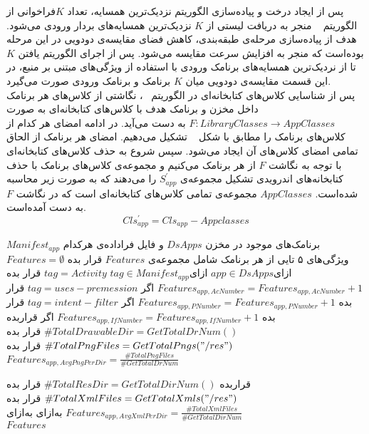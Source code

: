 پس از ایجاد درخت و پیاده‌سازی الگوریتم نزدیک‌ترین همسایه، تعداد $K $فراخوانی از الگوریتم ~ منجر به دریافت لیستی از $K $ نزدیک‌ترین همسایه‌های بردار ورودی می‌شود. 
هدف از پیاده‌سازی مرحله‌ی  طبقه‌بندی، کاهش فضای مقایسه‌ی دودویی در این مرحله بوده‌است که منجر به افزایش سرعت مقایسه می‌شود. پس از اجرای الگوریتم یافتن $K$ تا از نردیک‌ترین همسایه‌های برنامک ورودی با استفاده از ویژگی‌های مبتنی بر منبع، در این قسمت مقایسه‌ی دودویی میان $K$ برنامک و برنامک ورودی صورت می‌گیرد.\\ 
پس از شناسایی کلاس‌های کتابخانه‌ای در الگوریتم ~، نگاشتی از کلاس‌های هر برنامک داخل مخزن و برنامک هدف با کلاس‌های کتابخانه‌ای به صورت $F:LibraryClasses\rightarrow AppClasses$ به دست می‌آید. در ادامه امضای هر کدام از کلاس‌های برنامک را مطابق با شکل ~ تشکیل می‌دهیم. امضای هر برنامک از الحاق تمامی امضای کلاس‌های آن ایجاد می‌شود. سپس شروع به حذف کلاس‌های کتابخانه‌ای با توجه به نگاشت $F$ از هر برنامک می‌کنیم و مجموعه‌ی کلاس‌های برنامک با حذف کتابخانه‌های اندرویدی تشکیل مجموعه‌ی $S^{'}_{app}$ را می‌دهند که به صورت زیر محاسبه شده‌است.  $AppClasses$ مجموعه‌ی تمامی کلاس‌های کتابخانه‌ای است که در نگاشت $F$ به دست آمده‌است.
\begin{equation}
	Cls^{'}_{app} = Cls_{app} - Appclasses
\end{equation}




 برنامک‌های موجود در مخزن $DsApps$ و فایل فراداده‌ی هرکدام‌ $Manifest_{app}$
 ویژگی‌های ۵ تایی از هر برنامک شامل مجموعه‌ی $Features$
 قرار بده $Features=\emptyset$
‌ازای{$app \in  DsApps$} 
‌ازای{$tag \in Manifest_{app}$}
 $tag=Activity$
 قرار بده $Features_{app,AcNumber} =Features_{app,AcNumber} + 1 $
‌اگر
 $tag=uses-premession$
 قرار بده $Features_{app,PNumber} =Features_{app,PNumber} + 1 $
‌اگر
 $tag=intent-filter$
 قرار بده $Features_{app,IfNumber} =Features_{app,IfNumber} + 1 $
‌اگر
 قرار‌بده $\#TotalDrawableDir = GetTotalDrNum()$
 قرار بده $\#TotalPngFiles = GetTotalPngs("/res")$
 قرار بده $Features_{app,AvgPngPerDir}=  \frac{\#TotalPngFiles}{\#GetTotalDrNum}$

 قرار‌بده $\#TotalResDir = GetTotalDirNum()$
 قرار بده $\#TotalXmlFiles = GetTotalXmls("/res")$
 قرار بده $Features_{app,AvgXmlPerDir}=  \frac{\#TotalXmlFiles}{\#GetTotalDirNum}$
‌به‌ازای
‌به‌ازای\\
 $Features$

